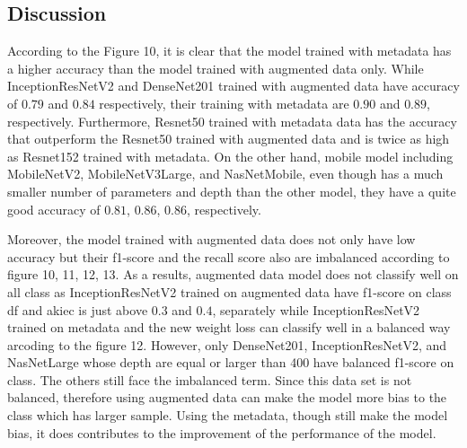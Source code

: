 \documentclass[sensors,article,submit,pdftex,moreauthors]{Definitions/mdpi}
\begin{document}
\subsection{Discussion} 

According to the Figure 10, it is clear that the model trained with metadata has a higher accuracy than the model trained with augmented data only. While InceptionResNetV2 and DenseNet201 trained with augmented data have accuracy of $0.79$ and $0.84$ respectively, their training with metadata are $0.90$ and $0.89$, respectively. Furthermore, Resnet50 trained with metadata data has the accuracy that outperform the Resnet50 trained with augmented data and is twice as high as Resnet152 trained with metadata. On the other hand, mobile model including MobileNetV2, MobileNetV3Large, and NasNetMobile, even though has a much smaller number of parameters and depth than the other model, they have a quite good accuracy of $0.81$, $0.86$, $0.86$, respectively. 

Moreover, the model trained with augmented data does not only have low accuracy but their f1-score and the recall score also are imbalanced according to figure 10, 11, 12, 13. As a results, augmented data model does not classify well on all class as InceptionResNetV2 trained on augmented data have f1-score on class df and akiec is just above $0.3$ and $0.4$, separately while InceptionResNetV2 trained on metadata and the new weight loss can classify well in a balanced way arcoding to the figure 12. However, only DenseNet201, InceptionResNetV2, and NasNetLarge whose depth are equal or larger than 400 have balanced f1-score on class. The others still face the imbalanced term. Since this data set is not balanced, therefore using augmented data can make the model more  bias to the class which has larger sample. Using the metadata, though still make the model bias, it does contributes to the improvement of  the performance of the model.
\end{document}
